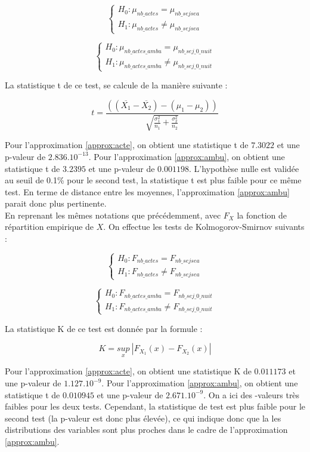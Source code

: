 $$\left\{
    \begin{array}{ll}
        H_0 : \mu_{nb\_actes} = \mu_{nb\_sejsea}\\
        H_1 : \mu_{nb\_actes} \ne \mu_{nb\_sejsea}
    \end{array} 
\right.$$

$$\left\{
    \begin{array}{ll}
        H_0 : \mu_{nb\_actes\_ambu} = \mu_{nb\_sej\_0\_nuit}\\
        H_1 : \mu_{nb\_actes\_ambu} \ne \mu_{nb\_sej\_0\_nuit}
    \end{array} 
\right.$$


\bigskip

La statistique t de ce test, se calcule de la manière suivante :

$$t = \frac{((\overline{X_1}-\overline{X_2})-(\mu_{1}-\mu_{2}))}{\sqrt{\frac{\sigma^2_{1}}{n_{1}}+\frac{\sigma^2_{2}}{n_{2}}}}$$

Pour l'approximation \ref{approx:acte}, on obtient une statistique t de $7.3022$ et une p-valeur de $2.836.10^{-13}$. Pour l'approximation \ref{approx:ambu}, on obtient une statistique t de $3.2395$ et une p-valeur de $0.001198$. L'hypothèse nulle est validée au seuil de 0.1\% pour le second test, la statistique t est plus faible pour ce même test. En terme de distance entre les moyennes, l'approximation \ref{approx:ambu} parait donc plus pertinente.\\

En reprenant les mêmes notations que précédemment, avec $F_X$ la fonction de répartition empirique de $X$. On effectue les tests de  Kolmogorov-Smirnov suivants :

$$\left\{
    \begin{array}{ll}
        H_0 : F_{nb\_actes} = F_{nb\_sejsea}\\
        H_1 : F_{nb\_actes} \ne F_{nb\_sejsea}
    \end{array} 
\right.$$

$$\left\{
    \begin{array}{ll}
        H_0 : F_{nb\_actes\_ambu} = F_{nb\_sej\_0\_nuit}\\
        H_1 : F_{nb\_actes\_ambu} \ne F_{nb\_sej\_0\_nuit}
    \end{array} 
\right.$$

La statistique K de ce test est donnée par la formule :

$$ K = \underset{x}{sup}\ |F_{X_1}(x) - F_{X_2}(x)| $$

Pour l'approximation \ref{approx:acte}, on obtient une statistique K de $0.011173$ et une p-valeur de $1.127.10^{-9}$. Pour l'approximation \ref{approx:ambu}, on obtient une statistique t de $0.010945$ et une p-valeur de $2.671.10^{-9}$. On a ici des -valeurs très faibles pour les deux tests. Cependant, la statistique de test est plus faible pour le second test (la p-valeur est donc plus élevée), ce qui indique donc que la les distributions des variables sont plus proches dans le cadre de l'approximation \ref{approx:ambu}.\\

